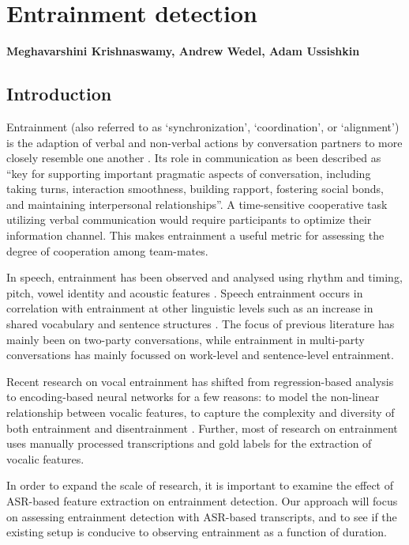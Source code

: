 \chapter{Entrainment detection}
\textbf{Meghavarshini Krishnaswamy, Andrew Wedel, Adam Ussishkin}
\section{Introduction}
    Entrainment (also referred to as `synchronization', `coordination', or `alignment') is the adaption of verbal and non-verbal actions by conversation partners to more closely resemble one another \parencite{borrie2014}. Its role in communication as been described as ``key for supporting important pragmatic aspects of conversation, including taking turns, interaction smoothness, building rapport, fostering social bonds, and maintaining interpersonal relationships''\parencite{borrie2019}. A time-sensitive cooperative task utilizing verbal communication would require participants to optimize their information channel. This makes entrainment a useful metric for assessing the degree of cooperation among team-mates.

    In speech, entrainment has been observed and analysed using rhythm and timing, pitch, vowel identity and acoustic features \parencite{reichel2018prosodic,borrie2019syncing}. Speech entrainment occurs in correlation with entrainment at other linguistic levels such as an increase in shared vocabulary and sentence structures \parencite{rahimi2017entrainment}. The focus of previous literature has mainly been on two-party conversations, while entrainment in multi-party conversations has mainly focussed on work-level and sentence-level entrainment. 

    Recent research on vocal entrainment has shifted from regression-based analysis to encoding-based neural networks for a few reasons: to model the non-linear relationship between vocalic features, to capture the complexity and diversity of both entrainment and disentrainment \parencite{nasir2020}. Further, most of research on entrainment uses manually processed transcriptions and gold labels for the extraction of vocalic features. 

    In order to expand the scale of research, it is important to examine the effect of ASR-based feature extraction on entrainment detection. Our approach will focus on assessing entrainment detection with ASR-based transcripts, and to see if the existing setup is conducive to observing entrainment as a function of duration. 

